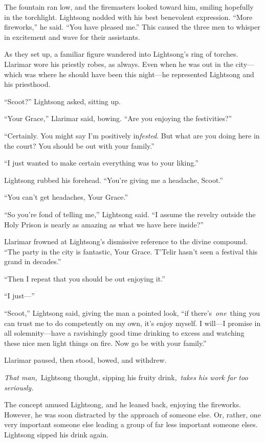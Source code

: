 The fountain ran low, and the firemasters looked toward him, smiling hopefully in the torchlight. Lightsong nodded with his best benevolent expression. “More fireworks,” he said. “You have pleased me.” This caused the three men to whisper in excitement and wave for their assistants.

As they set up, a familiar figure wandered into Lightsong’s ring of torches. Llarimar wore his priestly robes, as always. Even when he was out in the city—which was where he should have been this night—he represented Lightsong and his priesthood.

“Scoot?” Lightsong asked, sitting up.

“Your Grace,” Llarimar said, bowing. “Are you enjoying the festivities?”

“Certainly. You might say I’m positively in\textit{fested}. But what are you doing here in the court? You should be out with your family.”

“I just wanted to make certain everything was to your liking.”

Lightsong rubbed his forehead. “You’re giving me a headache, Scoot.”

“You can’t get headaches, Your Grace.”

“So you’re fond of telling me,” Lightsong said. “I assume the revelry outside the Holy Prison is nearly as amazing as what we have here inside?”

Llarimar frowned at Lightsong’s dismissive reference to the divine compound. “The party in the city is fantastic, Your Grace. T’Telir hasn’t seen a festival this grand in decades.”

“Then I repeat that you should be out enjoying it.”

“I just—”

“Scoot,” Lightsong said, giving the man a pointed look, “if there’s~\textit{one}~thing you can trust me to do competently on my own, it’s enjoy myself. I will—I promise in all solemnity—have a ravishingly good time drinking to excess and watching these nice men light things on fire. Now go be with your family.”

Llarimar paused, then stood, bowed, and withdrew.

\textit{That man,}~Lightsong thought, sipping his fruity drink,~\textit{takes his work far too seriously.}

The concept amused Lightsong, and he leaned back, enjoying the fireworks. However, he was soon distracted by the approach of someone else. Or, rather, one very important someone else leading a group of far less important someone elses. Lightsong sipped his drink again.

